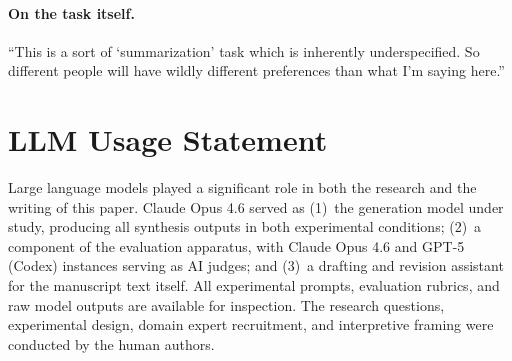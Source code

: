 \documentclass{article}
\begin{document}
\paragraph{On the task itself.} ``This is a sort of `summarization' task which is inherently underspecified. So different people will have wildly different preferences than what I'm saying here.''

\section{LLM Usage Statement}
\label{app:llm_usage}

Large language models played a significant role in both the research and the writing of this paper. Claude Opus 4.6 served as (1)~the generation model under study, producing all synthesis outputs in both experimental conditions; (2)~a component of the evaluation apparatus, with Claude Opus 4.6 and GPT-5 (Codex) instances serving as AI judges; and (3)~a drafting and revision assistant for the manuscript text itself. All experimental prompts, evaluation rubrics, and raw model outputs are available for inspection. The research questions, experimental design, domain expert recruitment, and interpretive framing were conducted by the human authors.
\end{document}

